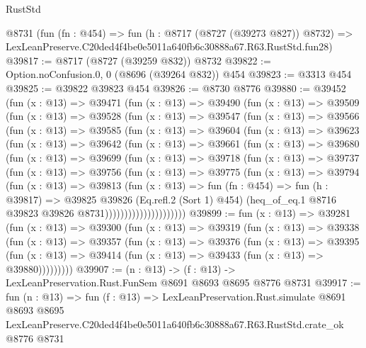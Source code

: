 \begin{lexlean}{RustStd}
\begin{coremodule}
    @8731
    (fun (fn : @454) =>
    fun (h : @8717 (@8727 (@39273 @827)) @8732) =>
    LexLeanPreserve.C20ded4f4be0e5011a640fb6c30888a67.R63.RustStd.fun28)
@39817 := @8717 (@8727 (@39259 @832)) @8732
@39822 := Option.noConfusion.{0, 0} (@8696 (@39264 @832)) @454
@39823 := @3313 @454
@39825 := @39822 @39823 @454
@39826 := @8730 @8776
@39880 := @39452
    (fun (x : @13) =>
    @39471
      (fun (x : @13) =>
      @39490
        (fun (x : @13) =>
        @39509
          (fun (x : @13) =>
          @39528
            (fun (x : @13) =>
            @39547
              (fun (x : @13) =>
              @39566
                (fun (x : @13) =>
                @39585
                  (fun (x : @13) =>
                  @39604
                    (fun (x : @13) =>
                    @39623
                      (fun (x : @13) =>
                      @39642
                        (fun (x : @13) =>
                        @39661
                          (fun (x : @13) =>
                          @39680
                            (fun (x : @13) =>
                            @39699
                              (fun (x : @13) =>
                              @39718
                                (fun (x : @13) =>
                                @39737
                                  (fun (x : @13) =>
                                  @39756
                                    (fun (x : @13) =>
                                    @39775
                                      (fun (x : @13) =>
                                      @39794
                                        (fun (x : @13) =>
                                        @39813
                                          (fun (x : @13) =>
                                          fun (fn : @454) =>
                                          fun (h : @39817) =>
                                          @39825
                                            @39826
                                            (Eq.refl.{2} (Sort 1) @454)
                                            (heq_of_eq.{1}
                                              @8716
                                              @39823
                                              @39826
                                              @8731)))))))))))))))))))))
@39899 := fun (x : @13) =>
  @39281
    (fun (x : @13) =>
    @39300
      (fun (x : @13) =>
      @39319
        (fun (x : @13) =>
        @39338
          (fun (x : @13) =>
          @39357
            (fun (x : @13) =>
            @39376
              (fun (x : @13) =>
              @39395
                (fun (x : @13) => @39414 (fun (x : @13) => @39433 (fun (x : @13) => @39880)))))))))
@39907 := (n : @13) -> (f : @13) -> LexLeanPreservation.Rust.FunSem @8691 @8693 @8695 @8776 @8731
@39917 := fun (n : @13) =>
  fun (f : @13) =>
  LexLeanPreservation.Rust.simulate
    @8691
    @8693
    @8695
    LexLeanPreserve.C20ded4f4be0e5011a640fb6c30888a67.R63.RustStd.crate_ok
    @8776
    @8731
\end{coremodule}
\end{lexlean}
